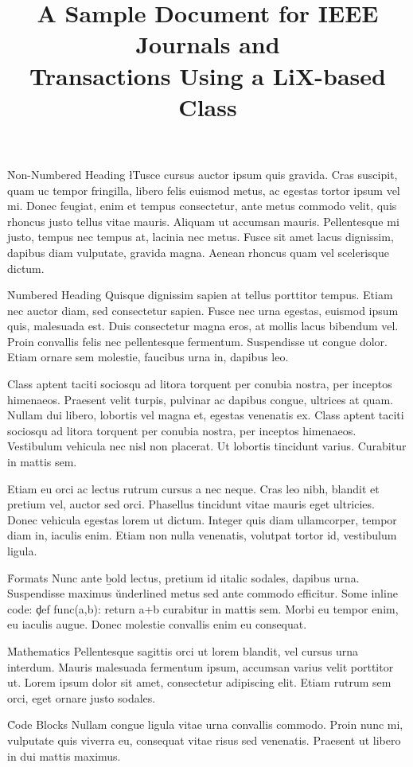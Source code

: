 \documentclass{ieee_modern}
\title    {A Sample Document for IEEE Journals and \\
           Transactions Using a LiX-based Class}
\begin{document}
\h*{Non-Numbered Heading}
\l{T}usce cursus auctor ipsum quis gravida. Cras suscipit, quam uc tempor fringilla, libero felis euismod metus, ac egestas tortor ipsum vel mi. Donec feugiat, enim et tempus consectetur, ante metus commodo velit, quis rhoncus justo tellus vitae mauris. Aliquam ut accumsan mauris. Pellentesque mi justo, tempus nec tempus at, lacinia nec metus. Fusce sit amet lacus dignissim, dapibus diam vulputate, gravida magna. Aenean rhoncus quam vel scelerisque dictum.

\h{Numbered Heading}
Quisque dignissim sapien at tellus porttitor tempus. Etiam nec auctor diam, sed consectetur sapien. Fusce nec urna egestas, euismod ipsum quis, malesuada est. Duis consectetur magna eros, at mollis lacus bibendum vel. Proin convallis felis nec pellentesque fermentum. Suspendisse ut congue dolor. Etiam ornare sem molestie, faucibus urna in, dapibus leo.

Class aptent taciti sociosqu ad litora torquent per conubia nostra, per inceptos himenaeos. Praesent velit turpis, pulvinar ac dapibus congue, ultrices at quam. Nullam dui libero, lobortis vel magna et, egestas venenatis ex. Class aptent taciti sociosqu ad litora torquent per conubia nostra, per inceptos himenaeos. Vestibulum vehicula nec nisl non placerat. Ut lobortis tincidunt varius. Curabitur in mattis sem.

Etiam eu orci ac lectus rutrum cursus a nec neque. Cras leo nibh, blandit et pretium vel, auctor sed orci. Phasellus tincidunt vitae mauris eget ultricies. Donec vehicula egestas lorem ut dictum. Integer quis diam ullamcorper, tempor diam in, iaculis enim. Etiam non nulla venenatis, volutpat tortor id, vestibulum ligula.

\h{Formats}
Nunc ante \b{bold} lectus, pretium id \i{italic} sodales, dapibus  urna. Suspendisse maximus \u{underlined} metus sed ante commodo efficitur. Some inline code: \c{def func(a,b): return a+b} curabitur in mattis sem. Morbi eu tempor enim, eu iaculis augue. Donec molestie convallis enim eu consequat.

\h{Mathematics}
Pellentesque sagittis orci ut lorem blandit, vel cursus urna interdum. Mauris malesuada fermentum ipsum, accumsan varius velit porttitor ut. Lorem ipsum dolor sit amet, consectetur adipiscing elit. Etiam rutrum sem orci, eget ornare justo sodales.


\h{Code Blocks}
Nullam congue ligula vitae urna convallis commodo. Proin nunc mi, vulputate quis viverra eu, consequat vitae risus sed venenatis. Praesent ut libero in dui mattis maximus.
\end{document}
